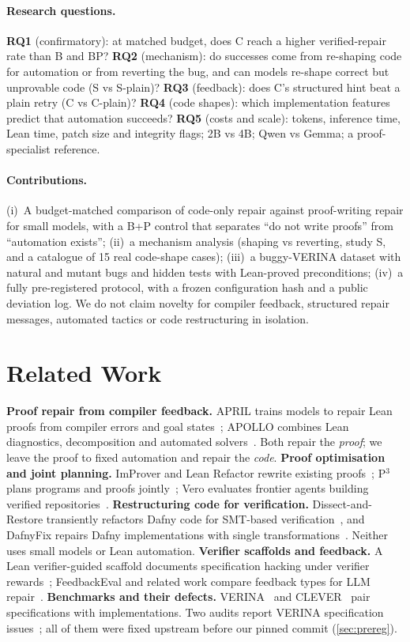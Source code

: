 \documentclass[10pt,twocolumn]{article}
\begin{document}
\paragraph{Research questions.}
\textbf{RQ1} (confirmatory): at matched budget, does C reach a higher verified-repair rate than B and BP?
\textbf{RQ2} (mechanism): do successes come from re-shaping code for automation or from reverting the bug, and
can models re-shape correct but unprovable code (S vs S-plain)?
\textbf{RQ3} (feedback): does C's structured hint beat a plain retry (C vs C-plain)?
\textbf{RQ4} (code shapes): which implementation features predict that automation succeeds?
\textbf{RQ5} (costs and scale): tokens, inference time, Lean time, patch size and integrity flags; 2B vs 4B;
Qwen vs Gemma; a proof-specialist reference.

\paragraph{Contributions.}
(i)~A budget-matched comparison of code-only repair against proof-writing repair for small models, with a
B+P control that separates ``do not write proofs'' from ``automation exists'';
(ii)~a mechanism analysis (shaping vs reverting, study S, and a catalogue of 15 real code-shape cases);
(iii)~a buggy-VERINA dataset with natural and mutant bugs and hidden tests with Lean-proved preconditions;
(iv)~a fully pre-registered protocol, with a frozen configuration hash and a public deviation log.
We do not claim novelty for compiler feedback, structured repair messages, automated tactics or code
restructuring in isolation.

\section{Related Work}
\textbf{Proof repair from compiler feedback.} APRIL trains models to repair Lean proofs from compiler errors and
goal states~\cite{april}; APOLLO combines Lean diagnostics, decomposition and automated solvers~\cite{apollo}.
Both repair the \emph{proof}; we leave the proof to fixed automation and repair the \emph{code}.
\textbf{Proof optimisation and joint planning.} ImProver and Lean Refactor rewrite existing
proofs~\cite{improver,leanrefactor}; P$^3$ plans programs and proofs jointly~\cite{p3}; Vero evaluates frontier
agents building verified repositories~\cite{vero}.
\textbf{Restructuring code for verification.} Dissect-and-Restore transiently refactors Dafny code for
SMT-based verification~\cite{dissect}, and DafnyFix repairs Dafny implementations with single
transformations~\cite{dafnyfix}. Neither uses small models or Lean automation.
\textbf{Verifier scaffolds and feedback.} A Lean verifier-guided scaffold documents specification hacking under
verifier rewards~\cite{mitthesis}; FeedbackEval and related work compare feedback types for LLM
repair~\cite{feedbackeval,propfeedback,symbolicfeedback}.
\textbf{Benchmarks and their defects.} VERINA~\cite{verina} and CLEVER~\cite{clever} pair specifications with
implementations. Two audits report VERINA specification issues~\cite{multimodalverifier,isomorphism}; all of
them were fixed upstream before our pinned commit (\cref{sec:prereg}).
\end{document}
